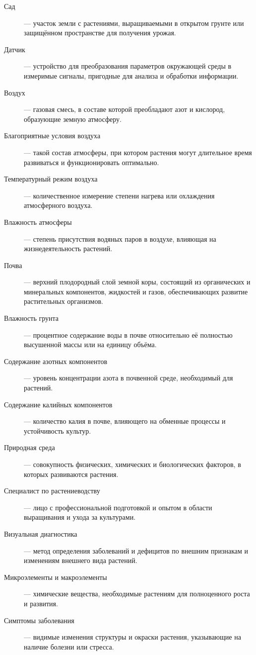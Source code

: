 \begin{description}
    \item[Сад] --- участок земли с растениями, выращиваемыми в открытом грунте или защищённом пространстве для получения урожая.
    \item[Датчик] --- устройство для преобразования параметров окружающей среды в измеримые сигналы, пригодные для анализа и обработки информации.
    \item[Воздух] --- газовая смесь, в составе которой преобладают азот и кислород, образующие земную атмосферу.
    \item[Благоприятные условия воздуха] --- такой состав атмосферы, при котором растения могут длительное время развиваться и функционировать оптимально.
    \item[Температурный режим воздуха] --- количественное измерение степени нагрева или охлаждения атмосферного воздуха.
    \item[Влажность атмосферы] --- степень присутствия водяных паров в воздухе, влияющая на жизнедеятельность растений.
    \item[Почва] --- верхний плодородный слой земной коры, состоящий из органических и минеральных компонентов, жидкостей и газов, обеспечивающих развитие растительных организмов.
    \item[Влажность грунта] --- процентное содержание воды в почве относительно её полностью высушенной массы или на единицу объёма.
    \item[Содержание азотных компонентов] --- уровень концентрации азота в почвенной среде, необходимый для растений.
    \item[Содержание калийных компонентов] --- количество калия в почве, влияющего на обменные процессы и устойчивость культур.
    \item[Природная среда] --- совокупность физических, химических и биологических факторов, в которых развиваются растения.
    \item[Специалист по растениеводству] --- лицо с профессиональной подготовкой и опытом в области выращивания и ухода за культурами.
    \item[Визуальная диагностика] --- метод определения заболеваний и дефицитов по внешним признакам и изменениям внешнего вида растений.
    \item[Микроэлементы и макроэлементы] --- химические вещества, необходимые растениям для полноценного роста и развития.
    \item[Симптомы заболевания] --- видимые изменения структуры и окраски растения, указывающие на наличие болезни или стресса.

\end{description}
